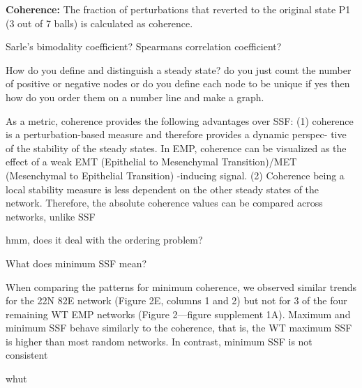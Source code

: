 \documentclass{article}
\begin{document}
\textbf{ Coherence: }The fraction of perturbations that reverted to the original state P1 (3 out of 7
balls) is calculated as coherence. 

Sarle's bimodality coefficient? Spearmans correlation coefficient?

How do you define and distinguish a steady state? do you just count the number of positive or negative nodes or do you define each node to be unique if yes then how do you order them on a number line and make a graph.


\begin{tcolorbox}[colback=yellow!5!white,colframe=yellow!50!black,
  colbacktitle=yellow!75!black,title= ]
  As a metric, coherence provides the following advantages
over SSF: (1) coherence is a perturbation-based measure and therefore provides a dynamic perspec-
tive of the stability of the steady states. In EMP, coherence can be visualized as the effect of a weak
EMT (Epithelial to Mesenchymal Transition)/MET (Mesenchymal to Epithelial Transition) -inducing
signal. (2) Coherence being a local stability measure is less dependent on the other steady states of
the network. Therefore, the absolute coherence values can be compared across networks, unlike SSF
  
\end{tcolorbox}
hmm, does it deal with the ordering problem?

What does minimum SSF mean?

\begin{tcolorbox}[colback=yellow!5!white,colframe=yellow!50!black,
  colbacktitle=yellow!75!black,title= ]
 When comparing the patterns for minimum coherence, we observed similar trends for the 22N
82E network (Figure 2E, columns 1 and 2) but not for 3 of the four remaining WT EMP networks
(Figure 2—figure supplement 1A). Maximum and minimum SSF behave similarly to the coherence,
that is, the WT maximum SSF is higher than most random networks. In contrast, minimum SSF is not
consistent 
  
\end{tcolorbox}

whut
\end{document}

